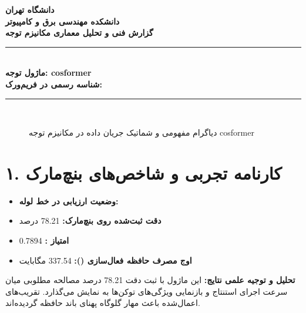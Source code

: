 \documentclass[12pt,a4paper]{article}
\begin{document}
\begin{center}
{\Large\bfseries دانشگاه تهران}\\[0.2cm]
{\large\bfseries دانشکده مهندسی برق و کامپیوتر}\\[0.2cm]
{\large\bfseries گزارش فنی و تحلیل معماری مکانیزم توجه}\\[0.5cm]
\rule{\linewidth}{1pt}\\[0.3cm]
{\LARGE\bfseries ماژول توجه: cosformer}\\[0.2cm]
{\large \textbf{شناسه رسمی در فریم‌ورک:} }\\[0.2cm]
\rule{\linewidth}{1pt}\\[0.5cm]
\end{center}

\begin{figure}[H]
\centering
{}
\caption{دیاگرام مفهومی و شماتیک جریان داده در مکانیزم توجه cosformer}
\end{figure}

\section*{۱. کارنامه تجربی و شاخص‌های بنچ‌مارک}
\begin{itemize}
\item \textbf{وضعیت ارزیابی در خط لوله:} 
\item \textbf{دقت ثبت‌شده روی بنچ‌مارک:} 78.21 درصد
\item \textbf{امتیاز :} 0.7894
\item \textbf{اوج مصرف حافظه فعال‌سازی ():} 337.54 مگابایت
\end{itemize}
\textbf{تحلیل و توجیه علمی نتایج:} این ماژول با ثبت دقت 78.21 درصد مصالحه مطلوبی میان سرعت اجرای استنتاج و بازنمایی ویژگی‌های توکن‌ها به نمایش می‌گذارد. تقریب‌های اعمال‌شده باعث مهار گلوگاه پهنای باند حافظه گردیده‌اند.
\end{document}
